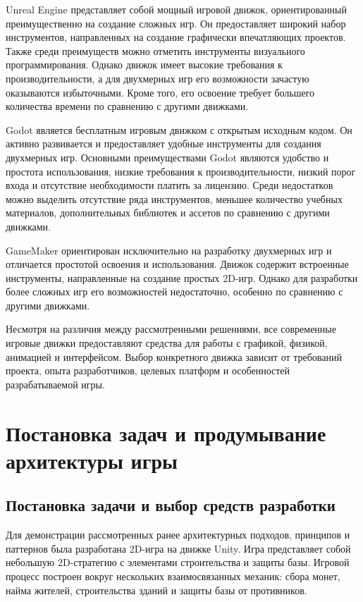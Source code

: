 \documentclass[a4paper,12pt]{report}
\begin{document}
Unreal Engine представляет собой мощный игровой движок, ориентированный преимущественно на создание сложных игр. Он предоставляет широкий набор инструментов, направленных на создание графически впечатляющих проектов. Также среди преимуществ можно отметить инструменты визуального программирования. Однако движок имеет высокие требования к производительности, а для двухмерных игр его возможности зачастую оказываются избыточными. Кроме того, его освоение требует большего количества времени по сравнению с другими движками.

Godot является бесплатным игровым движком с открытым исходным кодом. Он активно развивается и предоставляет удобные инструменты для создания двухмерных игр. Основными преимуществами Godot являются удобство и простота использования, низкие требования к производительности, низкий порог входа и отсутствие необходимости платить за лицензию. Среди недостатков можно выделить отсутствие ряда инструментов, меньшее количество учебных материалов, дополнительных библиотек и ассетов по сравнению с другими движками.

GameMaker ориентирован исключительно на разработку двухмерных игр и отличается простотой освоения и использования. Движок содержит встроенные инструменты, направленные на создание простых 2D-игр. Однако для разработки более сложных игр его возможностей недостаточно, особенно по сравнению с другими движками.

Несмотря на различия между рассмотренными решениями, все современные игровые движки предоставляют средства для работы с графикой, физикой, анимацией и интерфейсом. Выбор конкретного движка зависит от требований проекта, опыта разработчиков, целевых платформ и особенностей разрабатываемой игры.

\chapter{Постановка задач и продумывание архитектуры игры}\label{chapter:architecture}

\section{Постановка задачи и выбор средств разработки}

Для демонстрации рассмотренных ранее архитектурных подходов, принципов и паттернов была разработана 2D-игра на движке Unity. Игра представляет собой небольшую 2D-стратегию с элементами строительства и защиты базы. Игровой процесс построен вокруг нескольких взаимосвязанных механик: сбора монет, найма жителей, строительства зданий и защиты базы от противников.
\end{document}
